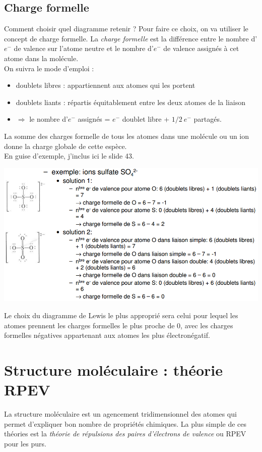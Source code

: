 \documentclass[british,french,11pt, a4paper, openany]{book}
\begin{document}
\subsection{Charge formelle}
Comment choisir quel diagramme retenir ? Pour faire ce choix, on va utiliser le concept de charge formelle.
La \textit{charge formelle} est la différence entre le nombre d'$e^-$ de valence sur l'atome neutre et le nombre d'$e^-$ de valence assignés à cet atome dans la molécule.\\
On suivra le mode d'emploi :
\begin{itemize}
	\item doublets libres : appartiennent aux atomes qui les portent
	\item doublets liants : répartis équitablement entre les deux atomes de la liaison
	\item $\Rightarrow$ le nombre d'$e^-$ assignés = $e^-$ doublet libre + $1/2\ e^-$ partagés.
\end{itemize}
La somme des charges formelle de tous les atomes dans une molécule ou un ion donne la charge globale de cette espèce.\\
En guise d'exemple, j'inclus ici le slide 43.\\
\begin{center}
	\includegraphics[scale=0.55]{image11.png}\\
\end{center}
Le choix du diagramme de Lewis le plus approprié sera celui pour lequel les atomes prennent les charges formelles le plus proche de 0, avec les charges formelles négatives appartenant aux atomes les plus électronégatif.

\newpage
\section{Structure moléculaire : théorie RPEV}
La structure moléculaire est un agencement tridimensionnel des atomes qui permet d'expliquer bon nombre de propriétés chimiques. La plus simple de ces théories est la \textit{théorie de répulsions des paires d'électrons de valence} ou RPEV pour les purs.\\
\end{document}
